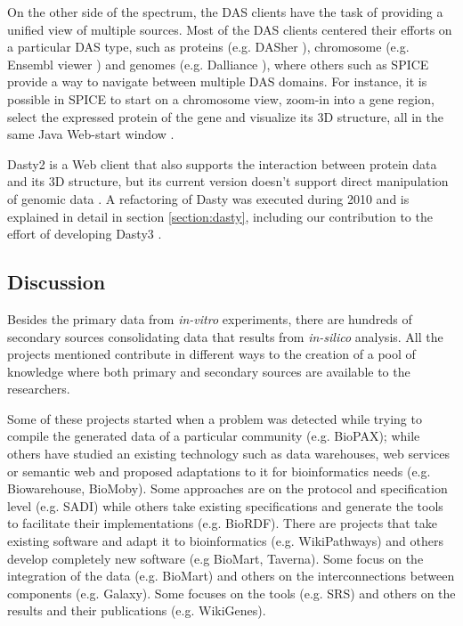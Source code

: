 On the other side of the spectrum, the DAS clients have the task of providing a unified view of multiple sources. Most of the DAS clients centered their efforts on a particular DAS type, such as proteins (e.g. DASher \cite{MES2009}), chromosome (e.g. Ensembl viewer \cite{FLI2011}) and genomes (e.g. Dalliance \cite{DOW2011}), where others such as SPICE provide a way to navigate between multiple DAS domains. For instance, it is possible in SPICE to start on a chromosome view, zoom-in into a gene region, select the expressed protein of the gene and visualize its 3D structure, all in the same Java Web-start window \cite{PRL2005}.

Dasty2 is a Web client that also supports the interaction between protein data and its 3D structure, but its current version doesn't support direct manipulation of genomic data \cite{JIM2008}. A refactoring of Dasty was executed during 2010 and is explained in detail in section \ref{section:dasty}, including our contribution to the effort of developing Dasty3 \cite{VIL2011}. 

\subsection{Discussion}
Besides the primary data from \emph{in-vitro} experiments, there are hundreds of secondary sources consolidating data that results from \emph{in-silico} analysis. All the projects mentioned contribute in different ways to the creation of a pool of knowledge where both primary and secondary sources are available to the researchers.

Some of these projects started when a problem was detected while trying to compile the generated data of a particular community (e.g. BioPAX); while others have studied an existing technology such as data warehouses, web services or semantic web and proposed adaptations to it for bioinformatics needs (e.g. Biowarehouse, BioMoby). Some approaches are on the protocol and specification level (e.g. SADI) while others take existing specifications and generate the tools to facilitate their implementations (e.g. BioRDF). There are projects that take existing software and adapt it to bioinformatics (e.g. WikiPathways) and others develop completely new software (e.g BioMart, Taverna). Some focus on the integration of the data (e.g. BioMart) and others on the interconnections between components (e.g. Galaxy). Some focuses on the tools (e.g. SRS) and others on the results and their publications (e.g. WikiGenes). 

